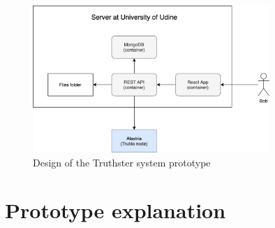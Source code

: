 \documentclass[target=mst,aauheader=]{thud}
\begin{document}
\begin{figure}
    \centering
    \includegraphics[width=0.8\textwidth]{images/prototypeSchema.png}
    \caption{Design of the Truthster system prototype}
    \label{fig:prototypeSchema}
\end{figure}

\section{Prototype explanation}
\end{document}
